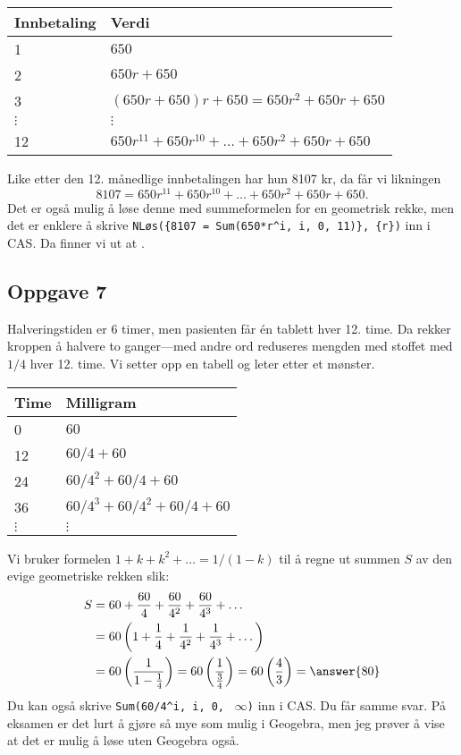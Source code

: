 \begin{easylist}[enumerate]
	\begin{center}
		\begin{tabular}{ll}
			Innbetaling & Verdi\\ \hline
			1 &  $650 $ \\
			2 &  $650 r + 650 $ \\
			3 &  $(650 r + 650)r + 650 = 650r^2 + 650r + 650 $ \\
			$\vdots$ & $\vdots$ \\
			12 & $650r^{11} + 650r^{10} + \dots + 650r^{2} + 650r + 650$ \\
		\end{tabular}
	\end{center}
	Like etter den 12. månedlige innbetalingen har hun 8107 kr,
	da får vi likningen 
	\begin{equation*}
		8107 = 650r^{11} + 650r^{10} + \dots + 650r^{2} + 650r + 650.
	\end{equation*}
	Det er også mulig å løse denne med summeformelen for en geometrisk rekke,
	men det er enklere å skrive \verb|NLøs({8107 = Sum(650*r^i, i, 0, 11)}, {r})| inn i CAS. Da finner vi ut at .
\end{easylist}

\subsection*{Oppgave 7}
Halveringstiden er 6 timer, men pasienten får én tablett hver 12. time.
Da rekker kroppen å halvere to ganger---med andre ord reduseres mengden med stoffet med $1/4$ hver 12. time.
Vi setter opp en tabell og leter etter et mønster.

\begin{center}
	\begin{tabular}{ll}
		Time & Milligram\\ \hline
		0 &  $60 $ \\
		12 &  $60/4 + 60$ \\
		24 &  $60/4^2 + 60/4 + 60$ \\
		36 &  $60/4^3 + 60/4^2 + 60/4 + 60$ \\
		$\vdots$ & $\vdots$
	\end{tabular}
\end{center}
Vi bruker formelen $1 + k + k^2 + \dots = 1 /(1 - k)$ til å regne ut summen $S$ av den evige geometriske rekken slik:
\begin{align*} 
	S &= 60 + \frac{60}{4}  + \frac{60}{4^2}  + \frac{60}{4^3} + \dots \\
	&= 60 \left( 1 +\frac{1}{4} + \frac{1}{4^2} + \frac{1}{4^3} + \dots  \right) \\
	&= 60 \left(  \frac{1}{1 - \frac{1}{4}}\right) = 60 \left(  \frac{1}{ \frac{3}{4}}\right)= 60 \left(  \frac{4}{ 3}\right)  = \answer{80}\\
\end{align*}
Du kan også skrive
\verb|Sum(60/4^i, i, 0, | $\infty$\verb|)| inn i CAS. Du får samme svar.
På eksamen er det lurt å gjøre så mye som mulig i Geogebra,
men jeg prøver å vise at det er mulig å løse uten Geogebra også.





